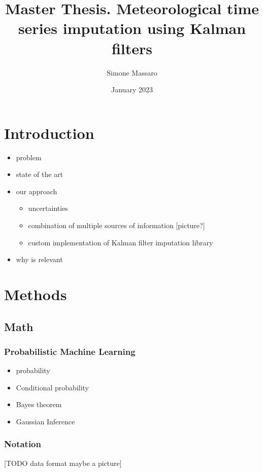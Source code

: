 \documentclass{article}
\title{Master Thesis. Meteorological time series imputation using Kalman filters}
\author{Simone Massaro}
\date{January 2023}
\begin{document}
\maketitle
\tableofcontents
\clearpage

\section{Introduction}

\begin{itemize}
    \item problem
    \item state of the art
    \item our approach
    \begin{itemize}
        \item uncertainties
        \item combination of multiple sources of information [picture?]
        \item custom implementation of Kalman filter imputation library
    \end{itemize}
    \item why is relevant
\end{itemize}

\section{Methods}

\subsection{Math}

\subsubsection{Probabilistic Machine Learning}

\begin{itemize}
\item probability
\item Conditional probability
\item Bayes theorem
\item Gaussian Inference
\end{itemize}

\subsubsection{Notation}

[TODO data format maybe a picture]
\end{document}
